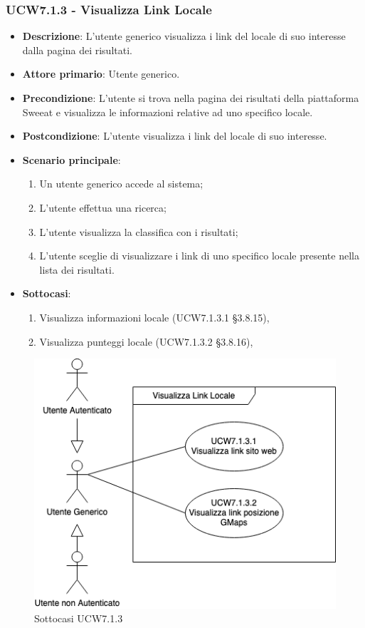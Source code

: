 \subsubsection{UCW7.1.3 - Visualizza Link Locale}
\begin{itemize}
	\item \textbf{Descrizione}: L'utente generico visualizza i link del locale di suo interesse dalla pagina dei risultati.
    \item \textbf{Attore primario}: Utente generico.
    \item \textbf{Precondizione}: L’utente si trova nella pagina dei risultati della piattaforma Sweeat e visualizza le informazioni relative ad uno specifico locale.
    \item \textbf{Postcondizione}: L’utente visualizza i link del locale di suo interesse.
    \item \textbf{Scenario principale}: 
    \begin{enumerate}
        \item Un utente generico accede al sistema;
        \item L’utente effettua una ricerca;
        \item L'utente visualizza la classifica con i risultati;
        \item L'utente sceglie di visualizzare i link di uno specifico locale presente nella lista dei risultati.
    \end{enumerate}
	\item \textbf{Sottocasi}:
    \begin{enumerate}
	\item Visualizza informazioni locale (UCW7.1.3.1 \S{3.8.15}),
	\item Visualizza punteggi locale (UCW7.1.3.2 \S{3.8.16}), 
	\end{enumerate}    
\end{itemize}

\begin{figure}[H]
    \centering
        \includegraphics[scale=0.5]{UC_images/UCW7-1-3-x.png}
        \caption{Sottocasi UCW7.1.3}
\end{figure}

